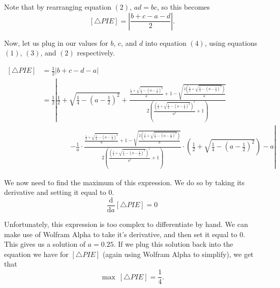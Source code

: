\documentclass[12pt]{article}
\begin{document}
\begin{solution}{3}
    Note that by rearranging equation $(2)$, $ad=bc$, so this becomes
    \begin{equation*}
        \left[\triangle PIE\right] = \left|\frac{b + c - a - d}2\right|. \tag{4}
    \end{equation*}
    
    Now, let us plug in our values for $b$, $c$, and $d$ into equation $(4)$, using equations $(1)$, $(3)$, and $(2)$ respectively.
    
    \begin{align*}
        \left[\triangle PIE\right]
        &= \frac12\big| b + c - d - a\big| \\
        &=\frac{1}{2}\left|\frac{1}{2}+\sqrt{\frac{1}{4}-\left(a-\frac{1}{2}\right)^{2}}+\frac{\frac{\frac{1}{2}+\sqrt{\frac{1}{4}-\left(a-\frac{1}{2}\right)^{2}}}{a}+1-\sqrt{\frac{2\left(\frac{1}{2}+\sqrt{\frac{1}{4}-\left(a-\frac{1}{2}\right)^{2}}\right)}{a}}}{2\left(\frac{\left(\frac{1}{2}+\sqrt{\frac{1}{4}-\left(a-\frac{1}{2}\right)^{2}}\right)^{2}}{a^{2}}+1\right)}\right.\\&\qquad\qquad\left.-
        \frac{1}{a}\cdot\frac{\frac{\frac{1}{2}+\sqrt{\frac{1}{4}-\left(a-\frac{1}{2}\right)^{2}}}{a}+1-\sqrt{\frac{2\left(\frac{1}{2}+\sqrt{\frac{1}{4}-\left(a-\frac{1}{2}\right)^{2}}\right)}{a}}}{2\left(\frac{\left(\frac{1}{2}+\sqrt{\frac{1}{4}-\left(a-\frac{1}{2}\right)^{2}}\right)^{2}}{a^{2}}+1\right)}\cdot\left(\frac{1}{2}+\sqrt{\frac{1}{4}-\left(a-\frac{1}{2}\right)^{2}}\right)-a\right|
    \end{align*}
    
    We now need to find the maximum of this expression. We do so by taking its derivative and setting it equal to 0.
    \begin{equation*}
        \frac{\mathrm d}{\mathrm da} [\triangle PIE] = 0
    \end{equation*}
    
    Unfortunately, this expression is too complex to differentiate by hand. We can make use of Wolfram Alpha to take it's derivative, and then set it equal to 0. This gives us a solution of $a = 0.25$. If we plug this solution back into the equation we have for $[\triangle PIE]$ (again using Wolfram Alpha to simplify), we get that
    \begin{equation*}
        \boxed{\max\ [\triangle PIE] = \frac14.} \tag*{\qed}
    \end{equation*}

\end{solution}
\end{document}
